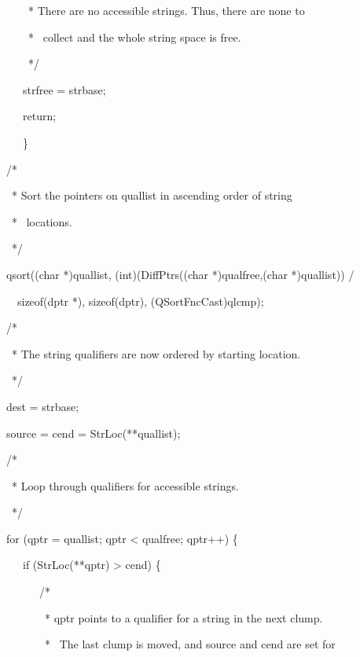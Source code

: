 {\ttfamily\mdseries
\ \ \ \ \ \ \ * There are no accessible strings. Thus, there are none to}

{\ttfamily\mdseries
\ \ \ \ \ \ \ * \ collect and the whole string space is free.}

{\ttfamily\mdseries
\ \ \ \ \ \ \ */
}

{\ttfamily\mdseries
\ \ \ \ \ \ strfree = strbase;
}

{\ttfamily\mdseries
\ \ \ \ \ \ return;
}

{\ttfamily\mdseries
\ \ \ \ \ \ \}
}

{\ttfamily\mdseries
\ \ \ /*
}

{\ttfamily\mdseries
\ \ \ \ * Sort the pointers on quallist in ascending order of string}

{\ttfamily\mdseries
\ \ \ \ * \ locations.
}

{\ttfamily\mdseries
\ \ \ \ */
}

{\ttfamily\mdseries
\ \ \ qsort((char *)quallist, (int)(DiffPtrs((char *)qualfree,(char *)quallist)) / }

{\ttfamily\mdseries
\ \ \ \ \ sizeof(dptr *), sizeof(dptr), (QSortFncCast)qlcmp);}

{\ttfamily\mdseries
\ \ \ /*
}

{\ttfamily\mdseries
\ \ \ \ * The string qualifiers are now ordered by starting location.}

{\ttfamily\mdseries
\ \ \ \ */
}

{\ttfamily\mdseries
\ \ \ dest = strbase;
}

{\ttfamily\mdseries
\ \ \ source = cend = StrLoc(**quallist);
}


\bigskip

{\ttfamily\mdseries
\ \ \ /*
}

{\ttfamily\mdseries
\ \ \ \ * Loop through qualifiers for accessible strings.}

{\ttfamily\mdseries
\ \ \ \ */
}

{\ttfamily\mdseries
\ \ \ for (qptr = quallist; qptr {\textless} qualfree; qptr++) \{
}

{\ttfamily\mdseries
\ \ \ \ \ \ if (StrLoc(**qptr) {\textgreater} cend) \{
}


\bigskip

{\ttfamily\mdseries
\ \ \ \ \ \ \ \ \ /*
}

{\ttfamily\mdseries
\ \ \ \ \ \ \ \ \ \ * qptr points to a qualifier for a string in the next clump.
}

{\ttfamily\mdseries
\ \ \ \ \ \ \ \ \ \ * \ The last clump is moved, and source and cend are set for
}

